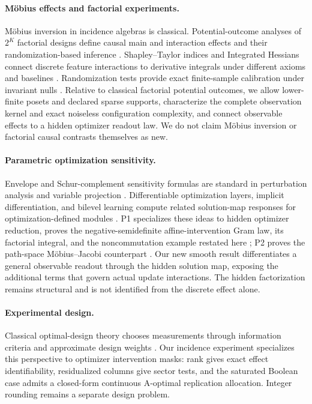 \paragraph{M\"obius effects and factorial experiments.}
M\"obius inversion in incidence algebras is classical.  Potential-outcome analyses of $2^K$ factorial designs define causal main and interaction effects and their randomization-based inference \citep{dasgupta2015causal}.  Shapley--Taylor indices and Integrated Hessians connect discrete feature interactions to derivative integrals under different axioms and baselines \citep{dhamdhere2020shapley,janizek2021explaining}.  Randomization tests provide exact finite-sample calibration under invariant nulls \citep{hemerik2018exact,phipson2010permutation}.  Relative to classical factorial potential outcomes, we allow lower-finite posets and declared sparse supports, characterize the complete observation kernel and exact noiseless configuration complexity, and connect observable effects to a hidden optimizer readout law.  We do not claim M\"obius inversion or factorial causal contrasts themselves as new.

\paragraph{Parametric optimization sensitivity.}
Envelope and Schur-complement sensitivity formulas are standard in perturbation analysis and variable projection \citep{golub1973differentiation,bonnans2000perturbation}.  Differentiable optimization layers, implicit differentiation, and bilevel learning compute related solution-map responses for optimization-defined modules \citep{amos2017optnet,blondel2022efficient,franceschi2018bilevel}.  P1 specializes these ideas to hidden optimizer reduction, proves the negative-semidefinite affine-intervention Gram law, its factorial integral, and the noncommutation example restated here \citep{li2026optimizationgeometrodynamics}; P2 proves the path-space M\"obius--Jacobi counterpart \citep{li2026restrictedcomplexity}.  Our new smooth result differentiates a general observable readout through the hidden solution map, exposing the additional terms that govern actual update interactions.  The hidden factorization remains structural and is not identified from the discrete effect alone.

\paragraph{Experimental design.}
Classical optimal-design theory chooses measurements through information criteria and approximate design weights \citep{pukelsheim2006optimal}.  Our incidence experiment specializes this perspective to optimizer intervention masks: rank gives exact effect identifiability, residualized columns give sector tests, and the saturated Boolean case admits a closed-form continuous A-optimal replication allocation.  Integer rounding remains a separate design problem.

